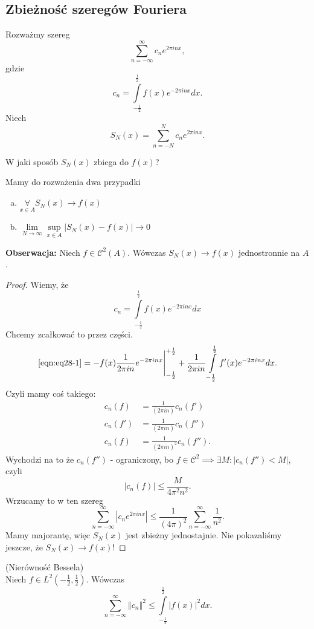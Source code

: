 \documentclass[../main.tex]{subfiles}
\begin{document}
\subsection{Zbieżność szeregów Fouriera}
    Rozważmy szereg
    \[
        \sum_{n=-\infty}^{\infty} c_n e^{2\pi i n x}
    ,\]
gdzie
\[
    c_n = \int\limits_{-\frac{1}{2}}^{\frac{1}{2}} f(x) e^{-2\pi i n x}dx
.\]
Niech
\[
    S_N(x) = \sum_{n=-N}^{N} c_n e^{2\pi i n x}
.\]
\begin{pytanie}
    W jaki sposób $S_N(x)$ zbiega do $f(x)$?
\end{pytanie}
Mamy do rozważenia dwa przypadki
\begin{enumerate}[a)]
    \item $\underset{x\in A}{\forall} S_N(x) \to f(x)$
    \item $\lim\limits_{N \to \infty}\underset{x\in A}{\sup} \left| S_N(x) - f(x) \right| \to 0$
\end{enumerate}
\textbf{Obserwacja: }Niech $f \in \mathcal{C}^2(A)$. Wówczas $S_N(x)\to f(x)$ jednostronnie na $A$.
\begin{proof}
    Wiemy, że
    \begin{equation}
        \label{eqn:eq28-1}
        c_n = \int\limits_{-\frac{1}{2}}^{\frac{1}{2}} f(x) e^{-2\pi i n x}dx \tag{$\star$}
    \end{equation}
Chcemy zcałkować to przez części.
\[
    \eqref{eqn:eq28-1} = -f(x) \frac{1}{2\pi i n}e^{-2\pi i n x}\Bigg|_{-\frac{1}{2}}^{+\frac{1}{2}} + \frac{1}{2\pi i n}\int\limits_{-\frac{1}{2}}^{\frac{1}{2}} f'(x) e^{-2\pi i n x}dx
.\]
Czyli mamy coś takiego:
\begin{align*}
    c_n(f) &= \frac{1}{(2\pi i n)}c_n(f')\\
    c_n(f') &= \frac{1}{(2\pi i n)} c_n (f'')\\
    c_n(f) &= \frac{1}{(2\pi i n)^2}c_n(f'')
.\end{align*}
    Wychodzi na to że $c_n(f'')$ - ograniczony, bo $f\in \mathcal{C}^2 \implies \exists M: \left| c_n(f'') < M \right|  $, czyli
    \[
        \left| c_n(f) \right| \le \frac{M}{4\pi^2 n^2}
    .\]
Wrzucamy to w ten szereg
\[
    \sum_{n=-\infty}^{\infty} \left| c_n e^{2\pi i n x} \right| \le \frac{1}{(4\pi)^2} \sum_{n=-\infty}^{\infty} \frac{1}{n^2}
.\]
Mamy majorantę, więc $S_N(x)$ jest zbieżny jednostajnie.
    Nie pokazaliśmy jeszcze, że $S_N(x)\to f(x)$!
\end{proof}
\begin{tw}
    (Nierówność Bessela)\\
    Niech $f\in L^2(-\frac{1}{2}, \frac{1}{2})$. Wówczas
    \[
        \sum_{n=-\infty}^{\infty} \left\Vert c_n \right\Vert^2 \le \int\limits_{-\frac{1}{2}}^{\frac{1}{2}} \left| f(x) \right|^2 dx
    .\]
\end{tw}
\end{document}
